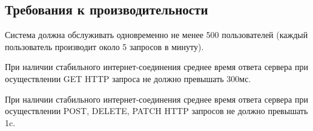 \documentclass[other-needs.tex]{subfiles}
\begin{document}
\subsection{Требования к производительности}
\par
Система должна обслуживать одновременно не менее 500 пользователей (каждый пользователь производит около 5 запросов в минуту).
\par
При наличии стабильного интернет-соединения среднее время ответа сервера при осуществлении GET HTTP запроса не должно превышать 300мс.
\par
При наличии стабильного интернет-соединения среднее время ответа сервера при осуществлении POST, DELETE, PATCH HTTP запросов не должно превышать 1c.
\end{document}
